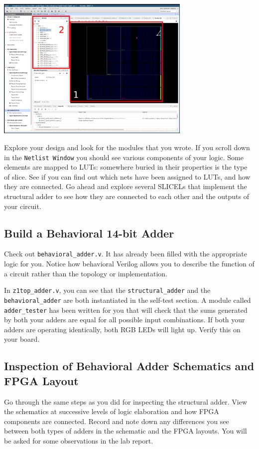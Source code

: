 \documentclass[11pt]{article}
\begin{document}
\begin{center}
  \includegraphics[width=0.7\textwidth]{figs/fpga_layout.png}
\end{center}

Explore your design and look for the modules that you wrote. If you scroll down in the \verb|Netlist Window| you should see various components of your logic. Some elements are mapped to LUTs: somewhere buried in their properties is the type of slice. See if you can find out which nets have been assigned to LUTs, and how they are connected. Go ahead and explore several SLICELs that implement the structural adder to see how they are connected to each other and the outputs of your circuit.

\subsection{Build a Behavioral 14-bit Adder}

Check out \verb|behavioral_adder.v|. It has already been filled with the appropriate logic for you. Notice how behavioral Verilog allows you to describe the function of a circuit rather than the topology or implementation.

In \verb|z1top_adder.v|, you can see that the \verb|structural_adder| and the \verb|behavioral_adder| are both instantiated in the self-test section. A module called \verb|adder_tester| has been written for you that will check that the sums generated by both your adders are equal for all possible input combinations. If both your adders are operating identically, both RGB LEDs will light up. Verify this on your board.

\subsection{Inspection of Behavioral Adder Schematics and FPGA Layout}
Go through the same steps as you did for inspecting the structural adder. View the schematics at successive levels of logic elaboration and how FPGA components are connected. Record and note down any differences you see between both types of adders in the schematic and the FPGA layouts. You will be asked for some observations in the lab report.
\end{document}
